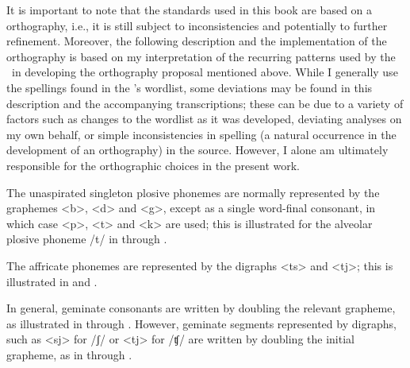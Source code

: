 It is important to note that the standards used in this book are based on a  orthography, i.e., it is still subject to inconsistencies and potentially to further refinement. Moreover, the following description and the implementation of the orthography is based on my interpretation of the recurring patterns used by the \WLP\ in developing the orthography proposal mentioned above. While I generally use the spellings found in the \WLP’s wordlist, some deviations may be found in this description and the accompanying transcriptions; these can be due to a variety of factors such as changes to the wordlist as it was developed, deviating analyses on my own behalf, or simple inconsistencies in spelling (a natural occurrence in the development of an orthography) in the source. However, I alone am ultimately responsible for the orthographic choices in the present work. 

The unaspirated singleton plosive phonemes are normally represented by the graphemes <b>, <d> and <g>, except as a single word-final consonant, in which case <p>, <t> and <k> are used; this is illustrated for the alveolar plosive phoneme /t/ in  through . 
\ea\label{spellExPlos1a}
\z
\ea\label{spellExPlos1b}
\z
\ea\label{spellExPlos1c}
\z

The affricate phonemes are represented by the digraphs <ts> and <tj>; this is illustrated in  and . 
\ea\label{spellEx0a}
\z
\ea\label{spellEx0b}
\z

In general, geminate consonants are written by doubling the relevant grapheme, as illustrated in  through . 
\ea\label{spellEx1}
\z
\ea\label{spellEx2}
\z
\ea\label{spellEx3}
\z
However, geminate segments represented by digraphs, such as <sj> for /ʃ/ or <tj> for /ʧ/ %
are written by doubling the initial grapheme, as in  through .
\ea\label{spellEx4}
\z
\ea\label{spellEx5}
\z
\ea\label{spellEx5b}
\z

